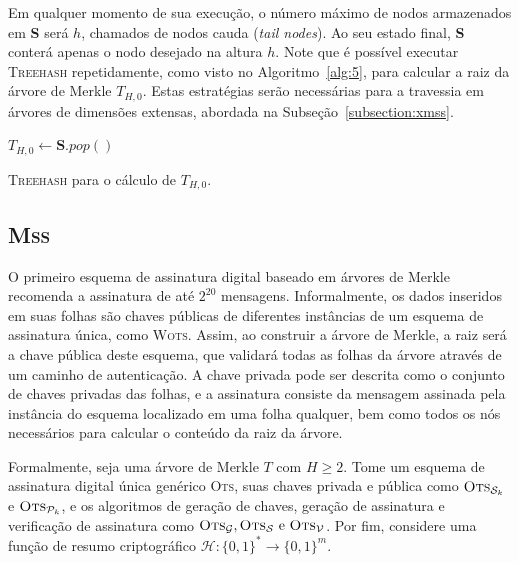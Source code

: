 \documentclass{ufsctex/ufsctex}
\newcommand{\hh}{\mathcal{H}}
\newcommand{\pk}{\mathcal{P}_k}
\newcommand{\sk}{\mathcal{S}_k}
\newcommand{\binwds}[1]{\{0, 1\}^{#1}}
\newcommand{\fhash}[1]{\hh{}: \binwds{*} \longrightarrow{} \binwds{#1}}
\newcommand{\wots}{\textsc{Wots}}
\newcommand{\mss}{\textsc{Mss}}
\begin{document}
Em qualquer momento de sua execução, o número máximo de nodos armazenados em
\textbf{S} será $h$, chamados de nodos cauda (\emph{tail nodes}). Ao seu estado
final, \textbf{S} conterá apenas o nodo desejado na altura $h$.  Note que é
possível executar \textsc{Treehash} repetidamente, como visto no
Algoritmo~\ref{alg:5}, para calcular a raiz da árvore de Merkle $T_{H,0}$.
Estas estratégias serão necessárias para a travessia em árvores de dimensões
extensas, abordada na Subseção~\ref{subsection:xmss}.

\begin{algorithm}
  \vspace{2mm}

  $T_{H, 0} \longleftarrow \mathbf{S}.pop()$\;

  \vspace{2mm}
  \caption{\textsc{Treehash} para o cálculo de $T_{H,0}$.}\label{alg:5}
\end{algorithm}

\subsection{\mss{}}\label{subsection:mss}

O primeiro esquema de assinatura digital baseado em árvores de
Merkle~\cite{Merkle:1989:CDS:118209.118230} recomenda a assinatura de até
$2^{20}$ mensagens. Informalmente, os dados inseridos em suas folhas são chaves
públicas de diferentes instâncias de um esquema de assinatura única, como
\wots{}. Assim, ao construir a árvore de Merkle, a raiz será a chave pública
deste esquema, que validará todas as folhas da árvore através de um caminho de
autenticação. A chave privada pode ser descrita como o conjunto de chaves
privadas das folhas, e a assinatura consiste da mensagem assinada pela
instância do esquema localizado em uma folha qualquer, bem como todos os nós
necessários para calcular o conteúdo da raiz da árvore.

Formalmente, seja uma árvore de Merkle $T$ com $H \geq 2$. Tome um esquema de
assinatura digital única genérico \textsc{Ots}, suas chaves privada e pública
como $\textsc{Ots}_{\sk{}}$ e $\textsc{Ots}_{\pk{}}$, e os algoritmos de
geração de chaves, geração de assinatura e verificação de assinatura como
$\textsc{Ots}_\mathcal{G}, \textsc{Ots}_\mathcal{S} \text{ e }
\textsc{Ots}_\mathcal{V}$. Por fim, considere uma função de resumo
criptográfico $\fhash{m}$.
\end{document}
